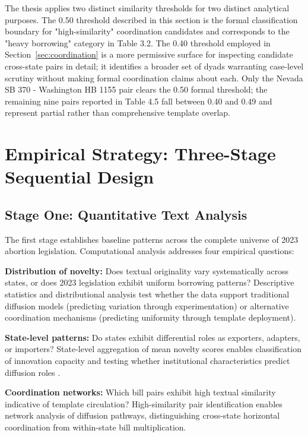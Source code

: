 The thesis applies two distinct similarity thresholds for two distinct analytical purposes. The 0.50 threshold described in this section is the formal classification boundary for "high-similarity" coordination candidates and corresponds to the "heavy borrowing" category in Table 3.2. The 0.40 threshold employed in Section~\ref{sec:coordination} is a more permissive surface for inspecting candidate cross-state pairs in detail; it identifies a broader set of dyads warranting case-level scrutiny without making formal coordination claims about each. Only the Nevada SB 370 - Washington HB 1155 pair clears the 0.50 formal threshold; the remaining nine pairs reported in Table 4.5 fall between 0.40 and 0.49 and represent partial rather than comprehensive template overlap.

\section{Empirical Strategy: Three-Stage Sequential Design}
\label{sec:strategy}

\subsection{Stage One: Quantitative Text Analysis}
The first stage establishes baseline patterns across the complete universe of 2023 abortion legislation. Computational analysis addresses four empirical questions:

\textbf{Distribution of novelty:} Does textual originality vary systematically across states, or does 2023 legislation exhibit uniform borrowing patterns? Descriptive statistics and distributional analysis test whether the data support traditional diffusion models (predicting variation through experimentation) or alternative coordination mechanisms (predicting uniformity through template deployment).

\textbf{State-level patterns:} Do states exhibit differential roles as exporters, adapters, or importers? State-level aggregation of mean novelty scores enables classification of innovation capacity and testing whether institutional characteristics predict diffusion roles \parencite{walkerDiffusionInnovationsAmerican1969, desmaraisPersistentPolicyPathways2015}.

\textbf{Coordination networks:} Which bill pairs exhibit high textual similarity indicative of template circulation? High-similarity pair identification enables network analysis of diffusion pathways, distinguishing cross-state horizontal coordination from within-state bill multiplication.

